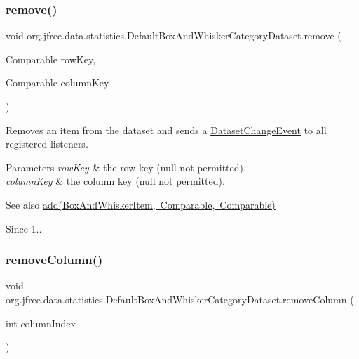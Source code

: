 \subsubsection{\texorpdfstring{remove()}{remove()}}
{\footnotesize\ttfamily void org.\+jfree.\+data.\+statistics.\+Default\+Box\+And\+Whisker\+Category\+Dataset.\+remove (\begin{DoxyParamCaption}\item[{Comparable}]{row\+Key,  }\item[{Comparable}]{column\+Key }\end{DoxyParamCaption})}

Removes an item from the dataset and sends a \mbox{\hyperlink{}{Dataset\+Change\+Event}} to all registered listeners.


\begin{DoxyParams}{Parameters}
{\em row\+Key} & the row key ({\ttfamily null} not permitted). \\
\hline
{\em column\+Key} & the column key ({\ttfamily null} not permitted).\\
\hline
\end{DoxyParams}
\begin{DoxySeeAlso}{See also}
\mbox{\hyperlink{classorg_1_1jfree_1_1data_1_1statistics_1_1_default_box_and_whisker_category_dataset_a3c62aefa490590e84f3f03faa59639bc}{add(\+Box\+And\+Whisker\+Item, Comparable, Comparable)}}
\end{DoxySeeAlso}
\begin{DoxySince}{Since}
1.. 
\end{DoxySince}
\mbox{\label{classorg_1_1jfree_1_1data_1_1statistics_1_1_default_box_and_whisker_category_dataset_a56079e33cbaf78aa51c310f59c54ed74}} 
\subsubsection{\texorpdfstring{remove\+Column()}{removeColumn()}\hspace{0.1cm}{\footnotesize\ttfamily [1/2]}}
{\footnotesize\ttfamily void org.\+jfree.\+data.\+statistics.\+Default\+Box\+And\+Whisker\+Category\+Dataset.\+remove\+Column (\begin{DoxyParamCaption}\item[{int}]{column\+Index }\end{DoxyParamCaption})}

